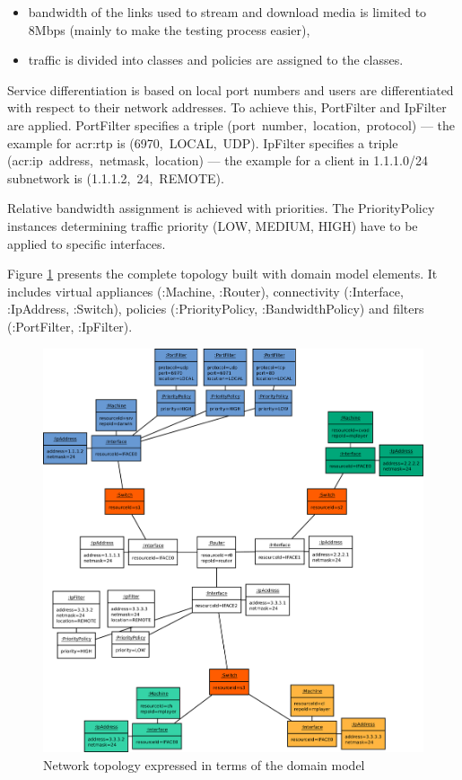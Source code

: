 \documentclass[11pt]{book}
\begin{document}
        \begin{itemize}
          \item bandwidth of the links used to stream and download media is limited to 8Mbps (mainly to make the
                testing process easier),
          \item traffic is divided into classes and policies are assigned to the classes.
        \end{itemize}

        Service differentiation is based on local port numbers and users are differentiated with respect to their
        network addresses. To achieve this, PortFilter and IpFilter are applied. PortFilter specifies a triple
        \mbox{(port number, location, protocol)} --- the example for \gls{acr:rtp} is \mbox{(6970, LOCAL, UDP)}.
        IpFilter specifies a triple \mbox{(\gls{acr:ip} address, netmask, location)} --- the example for a client in
        1.1.1.0/24 subnetwork is \mbox{(1.1.1.2, 24, REMOTE)}.

        Relative bandwidth assignment is achieved with priorities. The PriorityPolicy instances determining traffic
        priority (LOW, MEDIUM, HIGH) have to be applied to specific interfaces.

        Figure \ref{fig:cs:topo} presents the complete topology built with domain model elements. It includes virtual
        appliances (:Machine, :Router), connectivity (:Interface, :IpAddress, :Switch), policies (:PriorityPolicy,
        :BandwidthPolicy) and filters (:PortFilter, :IpFilter).

        \begin{figure}[H]
          \includegraphics[width=.9\textwidth]{img/test-case/topology-om.pdf}

          \caption{Network topology expressed in terms of the domain model}
          \label{fig:cs:topo}
        \end{figure}
\end{document}
